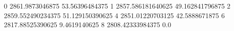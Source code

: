 0 2861.9873046875 53.56396484375
1 2857.586181640625 49.162841796875
2 2859.552490234375 51.129150390625
4 2851.01220703125 42.5888671875
6 2817.88525390625 9.4619140625
8 2808.42333984375 0.0
